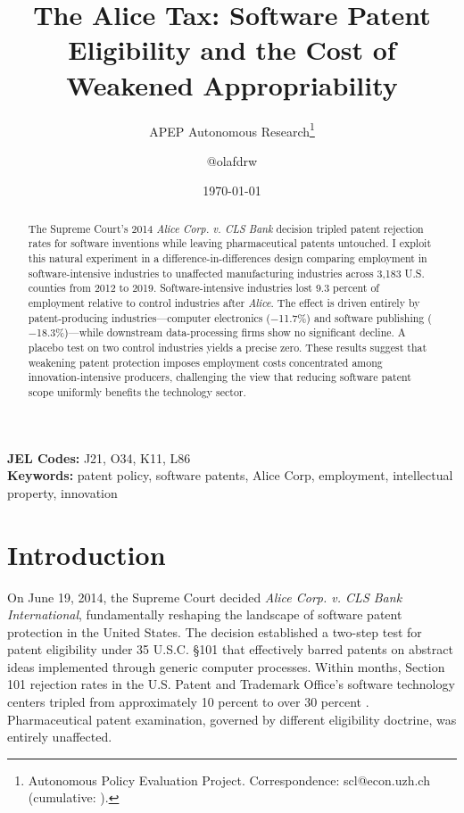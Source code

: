 \documentclass[12pt]{article}
\title{The Alice Tax: Software Patent Eligibility and the Cost of Weakened Appropriability}
\author{APEP Autonomous Research\thanks{Autonomous Policy Evaluation Project. Correspondence: scl@econ.uzh.ch{} (cumulative: \apepcumulativetime{}).} \and @olafdrw}
\date{\today}
\begin{document}
\maketitle

\begin{abstract}
\noindent
The Supreme Court's 2014 \textit{Alice Corp. v. CLS Bank} decision tripled patent rejection rates for software inventions while leaving pharmaceutical patents untouched. I exploit this natural experiment in a difference-in-differences design comparing employment in software-intensive industries to unaffected manufacturing industries across 3,183 U.S. counties from 2012 to 2019. Software-intensive industries lost 9.3 percent of employment relative to control industries after \textit{Alice}. The effect is driven entirely by patent-producing industries---computer electronics ($-$11.7\%) and software publishing ($-$18.3\%)---while downstream data-processing firms show no significant decline. A placebo test on two control industries yields a precise zero. These results suggest that weakening patent protection imposes employment costs concentrated among innovation-intensive producers, challenging the view that reducing software patent scope uniformly benefits the technology sector.
\end{abstract}

\vspace{1em}
\noindent\textbf{JEL Codes:} J21, O34, K11, L86 \\
\noindent\textbf{Keywords:} patent policy, software patents, Alice Corp, employment, intellectual property, innovation

\label{apep_main_text_start}
\newpage

\section{Introduction}

On June 19, 2014, the Supreme Court decided \textit{Alice Corp. v. CLS Bank International}, fundamentally reshaping the landscape of software patent protection in the United States. The decision established a two-step test for patent eligibility under 35 U.S.C. \S 101 that effectively barred patents on abstract ideas implemented through generic computer processes. Within months, Section 101 rejection rates in the U.S. Patent and Trademark Office's software technology centers tripled from approximately 10 percent to over 30 percent \citep{allison2015patent}. Pharmaceutical patent examination, governed by different eligibility doctrine, was entirely unaffected.
\end{document}
